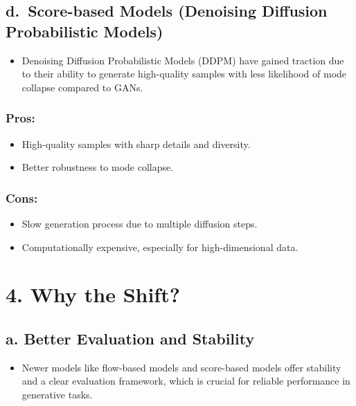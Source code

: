 \documentclass[
]{book}
\providecommand{\tightlist}{%
  \setlength{\itemsep}{0pt}\setlength{\parskip}{0pt}}
\begin{document}
\subsection{d.~Score-based Models (Denoising Diffusion Probabilistic Models)}\label{d.-score-based-models-denoising-diffusion-probabilistic-models}

\begin{itemize}
\tightlist
\item
  Denoising Diffusion Probabilistic Models (DDPM) have gained traction due to their ability to generate high-quality samples with less likelihood of mode collapse compared to GANs.
\end{itemize}

\subsubsection{Pros:}\label{pros-10}

\begin{itemize}
\tightlist
\item
  High-quality samples with sharp details and diversity.
\item
  Better robustness to mode collapse.
\end{itemize}

\subsubsection{Cons:}\label{cons-10}

\begin{itemize}
\tightlist
\item
  Slow generation process due to multiple diffusion steps.
\item
  Computationally expensive, especially for high-dimensional data.
\end{itemize}

\section{4. Why the Shift?}\label{why-the-shift}

\subsection{a. Better Evaluation and Stability}\label{a.-better-evaluation-and-stability}

\begin{itemize}
\tightlist
\item
  Newer models like flow-based models and score-based models offer stability and a clear evaluation framework, which is crucial for reliable performance in generative tasks.
\end{itemize}
\end{document}

